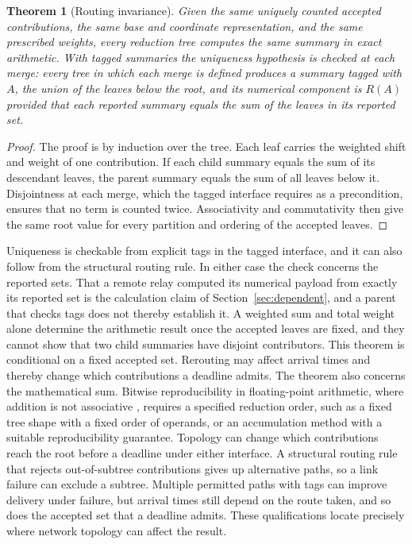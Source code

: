\documentclass[11pt]{article}
\newtheorem{theorem}{Theorem}
\theoremstyle{definition}
\theoremstyle{remark}
\begin{document}
\begin{theorem}[Routing invariance]\label{thm:routing}
Given the same uniquely counted accepted contributions, the same base and coordinate representation, and the same prescribed weights, every reduction tree computes the same summary in exact arithmetic. With tagged summaries the uniqueness hypothesis is checked at each merge: every tree in which each merge is defined produces a summary tagged with $A$, the union of the leaves below the root, and its numerical component is $R(A)$ provided that each reported summary equals the sum of the leaves in its reported set.
\end{theorem}

\begin{proof}
The proof is by induction over the tree. Each leaf carries the weighted shift and weight of one contribution. If each child summary equals the sum of its descendant leaves, the parent summary equals the sum of all leaves below it. Disjointness at each merge, which the tagged interface requires as a precondition, ensures that no term is counted twice. Associativity and commutativity then give the same root value for every partition and ordering of the accepted leaves.
\end{proof}

Uniqueness is checkable from explicit tags in the tagged interface, and it can also follow from the structural routing rule. In either case the check concerns the reported sets. That a remote relay computed its numerical payload from exactly its reported set is the calculation claim of Section~\ref{sec:dependent}, and a parent that checks tags does not thereby establish it. A weighted sum and total weight alone determine the arithmetic result once the accepted leaves are fixed, and they cannot show that two child summaries have disjoint contributors. This theorem is conditional on a fixed accepted set. Rerouting may affect arrival times and thereby change which contributions a deadline admits. The theorem also concerns the mathematical sum. Bitwise reproducibility in floating-point arithmetic, where addition is not associative \cite{goldberg1991}, requires a specified reduction order, such as a fixed tree shape with a fixed order of operands, or an accumulation method with a suitable reproducibility guarantee. Topology can change which contributions reach the root before a deadline under either interface. A structural routing rule that rejects out-of-subtree contributions gives up alternative paths, so a link failure can exclude a subtree. Multiple permitted paths with tags can improve delivery under failure, but arrival times still depend on the route taken, and so does the accepted set that a deadline admits. These qualifications locate precisely where network topology can affect the result.
\end{document}
